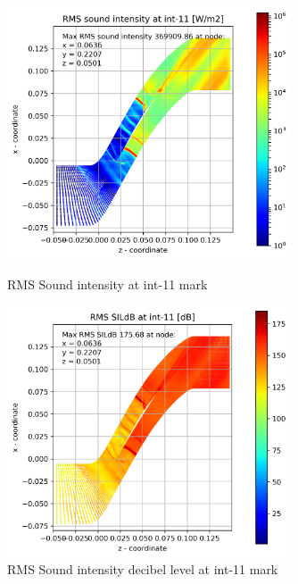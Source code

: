 \begin{figure}[ht]
  \centering
  \includegraphics[width=0.75\textwidth]{Figures/int-11-rms-sil.png} 
  \caption{RMS Sound intensity at int-11 mark} \label{int-11-rms-sil}
  
  \vspace*{\floatsep}%

  \includegraphics[width=0.75\textwidth]{Figures/int-11-rms-sildb.png} 
  \caption{RMS Sound intensity decibel level at int-11 mark} \label{int-11-rms-sildb}
\end{figure}



